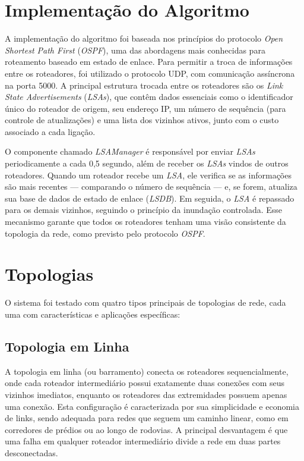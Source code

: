 \documentclass[12pt,a4paper]{report}
\begin{document}
\section{Implementação do Algoritmo}

A implementação do algoritmo foi baseada nos princípios do protocolo \textit{Open Shortest Path First} (\textit{OSPF}), uma das abordagens mais conhecidas para roteamento baseado em estado de enlace. Para permitir a troca de informações entre os roteadores, foi utilizado o protocolo UDP, com comunicação assíncrona na porta 5000. A principal estrutura trocada entre os roteadores são os \textit{Link State Advertisements} (\textit{LSAs}), que contêm dados essenciais como o identificador único do roteador de origem, seu endereço IP, um número de sequência (para controle de atualizações) e uma lista dos vizinhos ativos, junto com o custo associado a cada ligação.

O componente chamado \textit{LSAManager} é responsável por enviar \textit{LSAs} periodicamente a cada 0,5 segundo, além de receber os \textit{LSAs} vindos de outros roteadores. Quando um roteador recebe um \textit{LSA}, ele verifica se as informações são mais recentes — comparando o número de sequência — e, se forem, atualiza sua base de dados de estado de enlace (\textit{LSDB}). Em seguida, o \textit{LSA} é repassado para os demais vizinhos, seguindo o princípio da inundação controlada. Esse mecanismo garante que todos os roteadores tenham uma visão consistente da topologia da rede, como previsto pelo protocolo \textit{OSPF}.

\section{Topologias}

O sistema foi testado com quatro tipos principais de topologias de rede, cada uma com características e aplicações específicas:

\subsection{Topologia em Linha}

A topologia em linha (ou barramento) conecta os roteadores sequencialmente, onde cada roteador intermediário possui exatamente duas conexões com seus vizinhos imediatos, enquanto os roteadores das extremidades possuem apenas uma conexão. Esta configuração é caracterizada por sua simplicidade e economia de links, sendo adequada para redes que seguem um caminho linear, como em corredores de prédios ou ao longo de rodovias. A principal desvantagem é que uma falha em qualquer roteador intermediário divide a rede em duas partes desconectadas.
\end{document}
